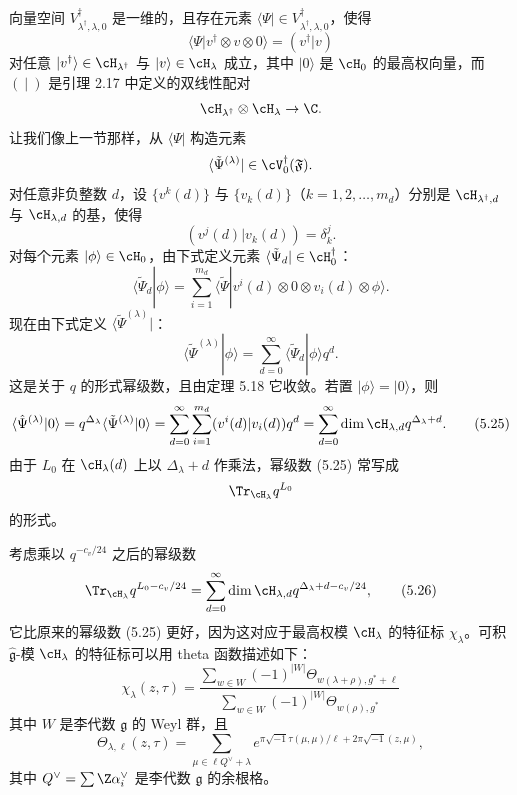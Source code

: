 向量空间 $V^\dagger_{\lambda^\dagger,\lambda,0}$ 是一维的，且存在元素 $\langle\Psi|\in V^\dagger_{\lambda^\dagger,\lambda,0}$，使得
\[
\langle\Psi|v^\dagger\otimes v\otimes 0\rangle=(v^\dagger|v)
\]
对任意 $|v^\dagger\rangle\in\cH_{\lambda^\dagger}$ 与 $|v\rangle\in\cH_\lambda$ 成立，其中 $|0\rangle$ 是 $\cH_0$ 的最高权向量，而 $(\ |\ )$ 是引理 2.17 中定义的双线性配对
\[
\cH_{\lambda^\dagger}\otimes\cH_\lambda\to\C.
\]
让我们像上一节那样，从 $\langle\Psi|$ 构造元素
\[
\langle\tilde\Psi^{(\lambda)}|\in\cV^\dagger_0(\mathfrak{F}).
\]
对任意非负整数 $d$，设 $\{v^k(d)\}$ 与 $\{v_k(d)\}$（$k=1,2,\dots,m_d$）分别是 $\cH_{\lambda^\dagger,d}$ 与 $\cH_{\lambda,d}$ 的基，使得
\[
(v^j(d)|v_k(d))=\delta^j_k.
\]
对每个元素 $|\phi\rangle\in\cH_0$，由下式定义元素 $\langle\tilde\Psi_d|\in\cH_0^\dagger$：
\[
\langle\tilde\Psi_d|\phi\rangle=\sum_{i=1}^{m_d}
\langle\tilde\Psi|v^i(d)\otimes0\otimes v_i(d)\otimes\phi\rangle.
\]
现在由下式定义 $\langle\tilde\Psi^{(\lambda)}|$：
\[
\langle\tilde\Psi^{(\lambda)}|\phi\rangle=\sum_{d=0}^{\infty}\langle\tilde\Psi_d|\phi\rangle q^d.
\]
这是关于 $q$ 的形式幂级数，且由定理 5.18 它收敛。若置 $|\phi\rangle=|0\rangle$，则
\begin{equation}
\langle\hat\Psi^{(\lambda)}|0\rangle=q^{\Delta_\lambda}\langle\tilde\Psi^{(\lambda)}|0\rangle
=\sum_{d=0}^{\infty}\sum_{i=1}^{m_d}(v^i(d)|v_i(d))q^d
=\sum_{d=0}^{\infty}\dim\cH_{\lambda,d}q^{\Delta_\lambda+d}. \tag{5.25}
\end{equation}
由于 $L_0$ 在 $\cH_\lambda(d)$ 上以 $\Delta_\lambda+d$ 作乘法，幂级数 (5.25) 常写成
\[
\Tr_{\cH_\lambda}q^{L_0}
\]
的形式。

考虑乘以 $q^{-c_v/24}$ 之后的幂级数
\begin{equation}
\Tr_{\cH_\lambda}q^{L_0-c_v/24}
=\sum_{d=0}^{\infty}\dim\cH_{\lambda,d}q^{\Delta_\lambda+d-c_v/24}, \tag{5.26}
\end{equation}
它比原来的幂级数 (5.25) 更好，因为这对应于最高权模 $\cH_\lambda$ 的特征标 $\chi_\lambda$。可积 $\hat{\mathfrak g}$-模 $\cH_\lambda$ 的特征标可以用 theta 函数描述如下：
\begin{equation}
\chi_\lambda(z,\tau)=
\frac{\sum_{w\in W}(-1)^{|W|}\Theta_{w(\lambda+\rho),g^*+\ell}}
     {\sum_{w\in W}(-1)^{|W|}\Theta_{w(\rho),g^*}} \tag{5.27}
\end{equation}
其中 $W$ 是李代数 $\mathfrak g$ 的 Weyl 群，且
\begin{equation}
\Theta_{\lambda,\ell}(z,\tau)=
\sum_{\mu\in\ell Q^\vee+\lambda}
e^{\pi\sqrt{-1}\tau(\mu,\mu)/\ell+2\pi\sqrt{-1}(z,\mu)}, \tag{5.28}
\end{equation}
其中 $Q^\vee=\sum\Z\alpha_i^\vee$ 是李代数 $\mathfrak g$ 的余根格。

